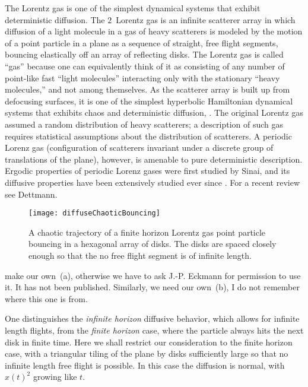 The Lorentz gas is one of the simplest dynamical systems
that exhibit deterministic diffusion. The $2$\dmn\ Lorentz gas is an
infinite scatterer array in which diffusion of a light molecule in a gas
of heavy scatterers is modeled by the motion of a point particle in a
plane as a sequence of straight, free flight segments, bouncing
elastically off an array of reflecting disks. The Lorentz gas is called
``gas'' because one can equivalently think of it as consisting of any
number of point-like fast ``light molecules'' interacting only with the
stationary ``heavy molecules,'' and not among themselves.  As the
scatterer array is built up from defocusing surfaces, it is one of the
simplest hyperbolic Hamiltonian dynamical systems that exhibits chaos and
deterministic diffusion, .
The original Lorentz gas assumed a random distribution of
heavy scatterers; a description of such gas requires statistical
assumptions about the distribution of scatterers. A periodic Lorenz gas
(configuration of scatterers invariant under a discrete group of
translations of the plane), however, is amenable to pure deterministic
description. Ergodic properties of periodic Lorenz gases were first
studied by Sinai, and its diffusive properties have been
extensively studied ever since%
.
For a recent review  see Dettmann.

\begin{figure}[htbp]
	\begin{center}
		\texttt{[image: diffuseChaoticBouncing]}
	\end{center}
	\caption[]{\label{fig-chaoticBouncing}
		A chaotic trajectory of a finite horizon Lorentz gas
		point particle bouncing in a
		hexagonal array of disks. The disks are spaced closely enough
		so that the no free flight segment is of infinite length.
	}
\end{figure}
 {make our own \,(a), otherwise
	we have to ask J.-P. Eckmann for permission to use it. It has not been
	published. Similarly, we need our own \,(b),
	I do not remember where this one is from.}

One distinguishes
the {\em infinite horizon} diffusive behavior, which allows for infinite
length flights, from
the {\em finite horizon} case, where the particle always
hits the next disk in finite time.
Here we shall restrict our consideration to the finite horizon case, with
a triangular tiling of the plane by disks sufficiently large so that no
infinite length free flight is possible. In this case the diffusion is
normal, with $\hat{x}(t)^2$ growing like $t$.

